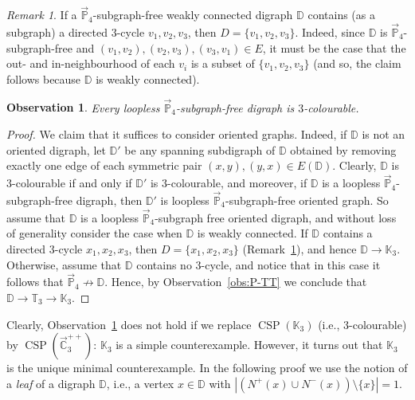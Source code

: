 \documentclass{article}
\newtheorem{observation}[theorem]{Observation}
\theoremstyle{definition}
\theoremstyle{remark}
\newtheorem{remark}[theorem]{Remark}
\DeclareMathOperator{\CSP}{CSP}
\newcommand{\bC}{{\mathbb C}}
\newcommand{\bD}{{\mathbb D}}
\newcommand{\bK}{{\mathbb K}}
\newcommand{\bP}{{\mathbb P}}
\newcommand{\bT}{{\mathbb T}}
\begin{document}
\begin{remark}\label{rmk:3-cycle}
    If a $\vec{\bP}_4$-subgraph-free weakly connected digraph $\bD$ contains
    (as a subgraph) a directed $3$-cycle $v_1,v_2,v_3$, then $D = \{v_1,v_2,v_3\}$.
    Indeed, since $\bD$ is $\vec{\bP}_4$-subgraph-free and $(v_1,v_2),(v_2,v_3),(v_3,v_1)\in E$,
    it must be the case that the out- and in-neighbourhood of each $v_i$ is a subset of
    $\{v_1,v_2,v_3\}$ (and so, the claim follows because $\bD$ is weakly connected).
\end{remark}

\begin{observation}\label{obs:K3-P4-subgraph-free}
    Every loopless $\vec{\bP}_4$-subgraph-free digraph is $3$-colourable.
\end{observation}
\begin{proof}
    We claim that it suffices to consider oriented graphs.
    Indeed, if $\bD$ is not an oriented digraph, let $\bD'$ be any spanning subdigraph
    of $\bD$ obtained by removing exactly one edge of each symmetric pair $(x,y),(y,x)\in E(\bD)$. 
    Clearly, $\bD$ is $3$-colourable if and only if $\bD'$ is $3$-colourable,
    and moreover, if $\bD$ is a loopless $\vec{\bP}_4$-subgraph-free digraph, then $\bD'$
    is loopless $\vec{\bP}_4$-subgraph-free oriented graph. So assume that $\bD$ is
    a loopless $\vec{\bP}_4$-subgraph free oriented digraph, and without loss of generality
    consider the case when $\bD$ is weakly connected. If $\bD$ contains a directed $3$-cycle
    $x_1,x_2,x_3$, then $D = \{x_1,x_2,x_3\}$ (Remark~\ref{rmk:3-cycle}), and hence $\bD\to \bK_3$. 
    Otherwise, assume that $\bD$ contains no $3$-cycle, and notice that in this case
    it follows that  $\vec{\bP}_4\not\to \bD$. Hence, by Observation~\ref{obs:P-TT}
    we conclude that $\bD\to \bT_3\to \bK_3$.
\end{proof}

Clearly, Observation~\ref{obs:K3-P4-subgraph-free} does not hold if we replace $\CSP(\bK_3)$ (i.e.,
$3$-colourable) by $\CSP(\vec{\bC}_3^{++})$: $\bK_3$ is a simple counterexample. However, it turns
out that $\bK_3$ is the unique minimal counterexample. In the following proof we
use the notion of a \emph{leaf} of a digraph $\bD$, i.e., a vertex $x\in \bD$ with
$|(N^+(x)\cup N^-(x))\setminus\{x\}| = 1$.
\end{document}

